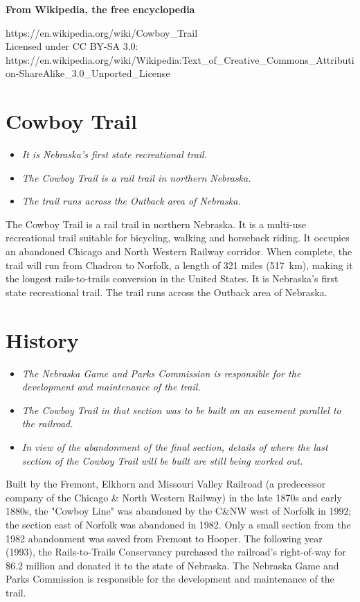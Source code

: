 \textbf{From Wikipedia, the free encyclopedia}

https://en.wikipedia.org/wiki/Cowboy\_Trail\\
Licensed under CC BY-SA 3.0:\\
https://en.wikipedia.org/wiki/Wikipedia:Text\_of\_Creative\_Commons\_Attribution-ShareAlike\_3.0\_Unported\_License

\section{Cowboy Trail}\label{cowboy-trail}

\begin{itemize}
\item
  \emph{It is Nebraska's first state recreational trail.}
\item
  \emph{The Cowboy Trail is a rail trail in northern Nebraska.}
\item
  \emph{The trail runs across the Outback area of Nebraska.}
\end{itemize}

The Cowboy Trail is a rail trail in northern Nebraska. It is a multi-use
recreational trail suitable for bicycling, walking and horseback riding.
It occupies an abandoned Chicago and North Western Railway corridor.
When complete, the trail will run from Chadron to Norfolk, a length of
321 miles (517~km), making it the longest rails-to-trails conversion in
the United States. It is Nebraska's first state recreational trail. The
trail runs across the Outback area of Nebraska.

\section{History}\label{history}

\begin{itemize}
\item
  \emph{The Nebraska Game and Parks Commission is responsible for the
  development and maintenance of the trail.}
\item
  \emph{The Cowboy Trail in that section was to be built on an easement
  parallel to the railroad.}
\item
  \emph{In view of the abandonment of the final section, details of
  where the last section of the Cowboy Trail will be built are still
  being worked out.}
\end{itemize}

Built by the Fremont, Elkhorn and Missouri Valley Railroad (a
predecessor company of the Chicago \& North Western Railway) in the late
1870s and early 1880s, the "Cowboy Line" was abandoned by the C\&NW west
of Norfolk in 1992; the section east of Norfolk was abandoned in 1982.
Only a small section from the 1982 abandonment was saved from Fremont to
Hooper. The following year (1993), the Rails-to-Trails Conservancy
purchased the railroad's right-of-way for \$6.2 million and donated it
to the state of Nebraska. The Nebraska Game and Parks Commission is
responsible for the development and maintenance of the trail.

